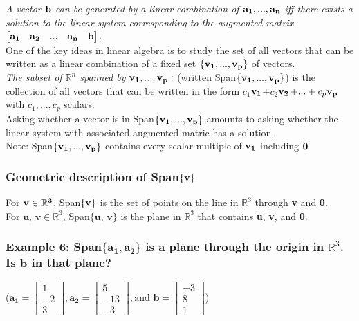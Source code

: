 \documentclass[12pt]{article} %
\newcommand{\R}{\mathbb{R}}
\begin{document}
\emph{A vector $\bf{b}$ can be generated by a linear combination of $\bf{a_1, ..., a_n}$ iff there exists a solution to the linear system corresponding to the augmented matrix $\begin{bmatrix}\bf{a_1} & \bf{a_2} & ... & \bf{a_n} & \bf{b}\end{bmatrix}$.}\\
One of the key ideas in linear algebra is to study the set of all vectors that can be written as a linear combination of a fixed set $\{ \bf{v_1, ..., v_p} \}$ of vectors.\\

\emph{The subset of $\R^n$ spanned by $\bf{v_1}, ..., \bf{v_p}:$} (written Span$\{\bf{v_1, ..., v_p}\}$) is the collection of all vectors that can be written in the form $c_1$$\bf{v_1 }$$ + c_2$$\bf{v_2 }$$ + ... + c_p\bf{v_p}$ with $c_1, ..., c_p$ scalars.\\

Asking whether a vector is in Span$\{\bf{v_1, ..., v_p}\}$ amounts to asking whether the linear system with associated augmented matric has a solution.\\

Note: Span$\{\bf{v_1, ..., v_p}\}$ contains every scalar multiple of $\bf{v_1}$ including $\bf{0}$
\subsubsection{Geometric description of Span$\{\bf{v}\}$}
For $\bf{v} \in \R^3$, Span$\{\bf{v}\}$ is the set of points on the line in $\R^3$ through \textbf{v} and \textbf{0}.\\
For $\textbf{u, v} \in \R^3$, Span$\{\textbf{u, v}\}$ is the plane in $\R^3$ that contains \textbf{u}, \textbf{v}, and \textbf{0}. \\

\subsubsection{Example 6: Span$\{\mathbf{a_1, a_2}\}$ is a plane through the origin in 
$\R^3$. Is $\mathbf{b}$ in that plane?}
\begin{center}
	($\mathbf{a_1} = \begin{bmatrix}1\\-2\\3\end{bmatrix}, 
	\mathbf{a_2} = \begin{bmatrix}5\\-13\\-3\end{bmatrix}, 
	\text{and }\mathbf{b} = \begin{bmatrix}-3\\8\\1\end{bmatrix}$)
\end{center}
\end{document}
